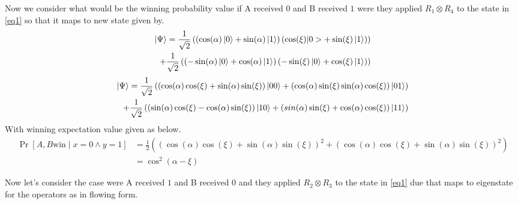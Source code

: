Now we consider what would be the winning probability value if A received $0$ and B received $1$ were they applied $R_1\otimes R_4$ to the state in \ref{eq1} so that it maps  to new state given by.
\begin{equation*}
\begin{aligned}
\ket{\Psi} = \frac{1}{\sqrt{2}}\left( \left(\cos(\alpha)\ket{0}+\sin(\alpha)\ket{1} \right) \left(\cos(\xi)|0>+\sin(\xi)\ket{1} \right) \right)  \\  
+\frac{1}{\sqrt{2}} \left( \left(-\sin(\alpha)\ket{0}+\cos(\alpha)\ket{1} \right) \left(-\sin(\xi)\ket{0}+\cos(\xi)\ket{1} \right) \right)
\end{aligned}
\end{equation*}
\begin{equation*}
\begin{aligned}
\ket{\Psi }= \frac{1}{\sqrt{2}}\left(\left(\cos(\alpha) \cos(\xi)+\sin(\alpha) \sin(\xi)\right)\ket{00}+\left( \cos(\alpha)  \sin(\xi)\sin(\alpha)  \cos(\xi)\right)\ket{01}\right)\\
+\frac{1}{\sqrt{2}}\left( \left( \sin(\alpha)  \cos(\xi)-\cos(\alpha) \sin(\xi)\right)\ket{10}+\left(sin(\alpha)  \sin(\xi)+\cos(\alpha)  \cos(\xi)\right)\ket{11}\right)
\end{aligned}
\end{equation*}
With winning expectation value given as below.
\begin{align} 
\Pr[A,B \text{win}  \mid  x=0 \wedge y=1]&=\frac{1}{2}\left(\left(\cos(\alpha)  \cos(\xi)+\sin(\alpha)\sin(\xi)\right)^2  +\left(\cos(\alpha)  \cos(\xi)+\sin(\alpha)\sin(\xi)\right)^2  \right)\nonumber\\ 
&=\cos^2(\alpha-\xi)\label{eq3}
\end{align}

Now let's consider  the case were  A received $1$ and B received $0$  and they applied $R_2\otimes R_3$ to the state in \ref{eq1}  due that maps to eigenstate for the operators as in flowing form.

